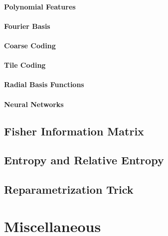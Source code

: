 				\paragraph{Polynomial Features} %

				\paragraph{Fourier Basis} %

				\paragraph{Coarse Coding} %

				\paragraph{Tile Coding} %

				\paragraph{Radial Basis Functions} %

				\paragraph{Neural Networks} %

		\subsection{Fisher Information Matrix} %

		\subsection{Entropy and Relative Entropy} %

		\subsection{Reparametrization Trick} %

	\section{Miscellaneous} %

